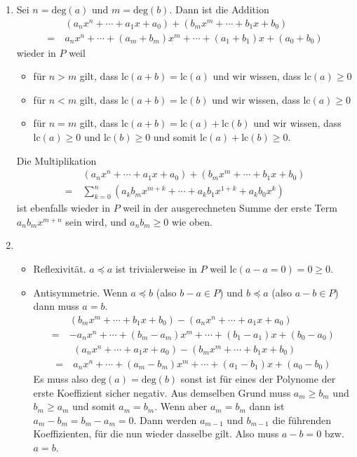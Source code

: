 \documentclass{article}
\begin{document}
\begin{enumerate}
    \item Sei $n = \text{deg}(a)$ und $m = \text{deg}(b)$. Dann ist die Addition
    \begin{align*}
        &(a_nx^n + \cdots + a_1x + a_0) + (b_mx^m + \cdots + b_1x + b_0) \\
        =\ &a_nx^n + \cdots + (a_m + b_m)x^m + \cdots + (a_1 + b_1)x + (a_0 + b_0) 
    \end{align*}
    wieder in $P$ weil
    \begin{itemize}
        \item für $n > m$ gilt, dass $\text{lc}(a + b) = \text{lc}(a)$ und wir wissen, dass $\text{lc}(a) \geq 0$
        \item für $n < m$ gilt, dass $\text{lc}(a + b) = \text{lc}(b)$ und wir wissen, dass $\text{lc}(a) \geq 0$
        \item für $n = m$ gilt, dass $\text{lc}(a + b) = \text{lc}(a) + \text{lc}(b)$ und wir wissen, dass $\text{lc}(a) \geq 0$ und $\text{lc}(b) \geq 0$ und somit $\text{lc}(a) + \text{lc}(b) \geq 0$.
    \end{itemize}
    Die Multiplikation
    \begin{align*}
        &(a_nx^n + \cdots + a_1x + a_0) + (b_mx^m + \cdots + b_1x + b_0) \\
        =\ &\sum_{k = 0}^n (a_kb_mx^{m + k} + \cdots + a_kb_1x^{1 + k} + a_kb_0x^k)
    \end{align*}
    ist ebenfalls wieder in $P$ weil in der ausgerechneten Summe der erste Term $a_nb_mx^{m + n}$ sein wird, und $a_nb_m \geq 0$ wie oben.

    \item \begin{itemize}
        \item Reflexivität. $a \preccurlyeq a$ ist trivialerweise in $P$ weil $\text{lc}(a - a = 0) = 0 \geq 0$.
        
        \item Antisymmetrie. Wenn $a \preccurlyeq b$ (also $b - a \in P$) und $b \preccurlyeq a$ (also $a - b \in P$) dann muss $a = b$.
        \begin{align*}
            &(b_mx^m + \cdots + b_1x + b_0) - (a_nx^n + \cdots + a_1x + a_0) \\
            =\ &-a_nx^n + \cdots + (b_m - a_m)x^m + \cdots + (b_1 - a_1)x + (b_0 - a_0) 
        \end{align*}
        \begin{align*}
            &(a_nx^n + \cdots + a_1x + a_0) - (b_mx^m + \cdots + b_1x + b_0) \\
            =\ &a_nx^n + \cdots + (a_m - b_m)x^m + \cdots + (a_1 - b_1)x + (a_0 - b_0) 
        \end{align*}
        Es muss also $\text{deg}(a) = \text{deg}(b)$ sonst ist für eines der Polynome der erste Koeffizient sicher negativ. Aus demselben Grund muss $a_m \geq b_m$ und $b_m \geq a_m$ und somit $a_m = b_m$. Wenn aber $a_m = b_m$ dann ist $a_m - b_m = b_m - a_m = 0$. Dann werden $a_{m - 1}$ und $b_{m - 1}$ die führenden Koeffizienten, für die nun wieder dasselbe gilt. Also muss $a - b = 0$ bzw. $a = b$.
        

\end{itemize}
\end{enumerate}
\end{document}
